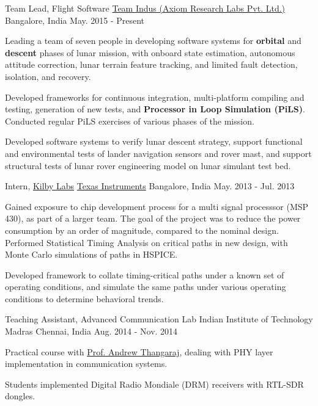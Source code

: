 \begin{cventries}
	\cventry
	{Team Lead, Flight Software}
	{\href{http://www.teamindus.in/}{Team Indus (Axiom Research Labs Pvt. Ltd.)}}
	{Bangalore, India}
	{May. 2015 - Present}
	{
		\begin{cvitems}
			\item{Leading a team of seven people in developing software systems for \textbf{orbital} and \textbf{descent} phases of lunar mission, with onboard state estimation, autonomous attitude correction, lunar terrain feature tracking, and limited fault detection, isolation, and recovery.}
			\item{Developed frameworks for continuous integration, multi-platform compiling and testing, generation of new tests, and \textbf{Processor in Loop Simulation (PiLS)}. Conducted regular PiLS exercises of various phases of the mission.}
			\item{Developed software systems to verify lunar descent strategy, support functional and environmental tests of lander navigation sensors and rover mast, and support structural tests of lunar rover engineering model on lunar simulant test bed.}
		\end{cvitems}
	}

	\cventry
	{Intern, \href{http://www.ti.com/corp/docs/innovation/research-development/Kilby-Labs.html}{Kilby Labs}}
	{\href{http://www.ti.com/}{Texas Instruments}}
	{Bangalore, India}
	{May. 2013 - Jul. 2013}
	{
		\begin{cvitems}
		\item{Gained exposure to chip development process for a multi signal processsor (MSP 430), as part of a larger team. The goal of the project was to reduce the power consumption by an order of magnitude, compared to the nominal design. Performed Statistical Timing Analysis on critical paths in new design, with Monte Carlo simulations of paths in HSPICE.}
		\item{Developed framework to collate timing-critical paths under a known set of operating conditions, and simulate the same paths under various operating conditions to determine behavioral trends.}
		\end{cvitems}
	}

	\cventry
	{Teaching Assistant, Advanced Communication Lab}
	{Indian Institute of Technology Madras}
	{Chennai, India}
	{Aug. 2014 - Nov. 2014}
	{
		\begin{cvitems}
		\item{Practical course with \href{http://www.ee.iitm.ac.in/~andrew/}{Prof. Andrew Thangaraj}, dealing with PHY layer implementation in communication systems.}
		\item{Students implemented Digital Radio Mondiale (DRM) receivers with RTL-SDR dongles.}
		\end{cvitems}
	}

\end{cventries}
